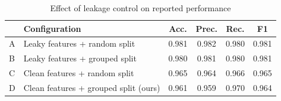 \begin{table}[t]
\caption{Effect of leakage control on reported performance}
\label{tab:leakage}
\centering
\begin{tabular}{llcccc}
\hline
& Configuration & Acc. & Prec. & Rec. & F1 \\
\hline
A & Leaky features + random split & 0.981 & 0.982 & 0.980 & 0.981 \\
B & Leaky features + grouped split & 0.980 & 0.981 & 0.980 & 0.981 \\
C & Clean features + random split & 0.965 & 0.964 & 0.966 & 0.965 \\
D & Clean features + grouped split (ours) & 0.961 & 0.959 & 0.970 & 0.964 \\
\hline
\end{tabular}
\end{table}
